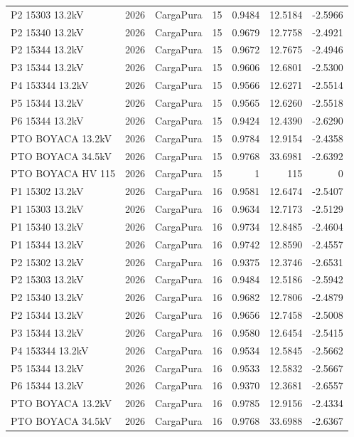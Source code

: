 \documentclass[11pt,a4paper]{article}
\begin{document}
\begin{longtable}{llllrrr}
P2 15303 13.2kV & 2026 & CargaPura & 15 & 0.9484 & 12.5184 & -2.5966 \\
P2 15340 13.2kV & 2026 & CargaPura & 15 & 0.9679 & 12.7758 & -2.4921 \\
P2 15344 13.2kV & 2026 & CargaPura & 15 & 0.9672 & 12.7675 & -2.4946 \\
P3 15344 13.2kV & 2026 & CargaPura & 15 & 0.9606 & 12.6801 & -2.5300 \\
P4 153344 13.2kV & 2026 & CargaPura & 15 & 0.9566 & 12.6271 & -2.5514 \\
P5 15344 13.2kV & 2026 & CargaPura & 15 & 0.9565 & 12.6260 & -2.5518 \\
P6 15344 13.2kV & 2026 & CargaPura & 15 & 0.9424 & 12.4390 & -2.6290 \\
PTO BOYACA 13.2kV & 2026 & CargaPura & 15 & 0.9784 & 12.9154 & -2.4358 \\
PTO BOYACA 34.5kV & 2026 & CargaPura & 15 & 0.9768 & 33.6981 & -2.6392 \\
PTO BOYACA HV 115 & 2026 & CargaPura & 15 & 1 & 115 & 0 \\
P1 15302 13.2kV & 2026 & CargaPura & 16 & 0.9581 & 12.6474 & -2.5407 \\
P1 15303 13.2kV & 2026 & CargaPura & 16 & 0.9634 & 12.7173 & -2.5129 \\
P1 15340 13.2kV & 2026 & CargaPura & 16 & 0.9734 & 12.8485 & -2.4604 \\
P1 15344 13.2kV & 2026 & CargaPura & 16 & 0.9742 & 12.8590 & -2.4557 \\
P2 15302 13.2kV & 2026 & CargaPura & 16 & 0.9375 & 12.3746 & -2.6531 \\
P2 15303 13.2kV & 2026 & CargaPura & 16 & 0.9484 & 12.5186 & -2.5942 \\
P2 15340 13.2kV & 2026 & CargaPura & 16 & 0.9682 & 12.7806 & -2.4879 \\
P2 15344 13.2kV & 2026 & CargaPura & 16 & 0.9656 & 12.7458 & -2.5008 \\
P3 15344 13.2kV & 2026 & CargaPura & 16 & 0.9580 & 12.6454 & -2.5415 \\
P4 153344 13.2kV & 2026 & CargaPura & 16 & 0.9534 & 12.5845 & -2.5662 \\
P5 15344 13.2kV & 2026 & CargaPura & 16 & 0.9533 & 12.5832 & -2.5667 \\
P6 15344 13.2kV & 2026 & CargaPura & 16 & 0.9370 & 12.3681 & -2.6557 \\
PTO BOYACA 13.2kV & 2026 & CargaPura & 16 & 0.9785 & 12.9156 & -2.4334 \\
PTO BOYACA 34.5kV & 2026 & CargaPura & 16 & 0.9768 & 33.6988 & -2.6367 \\

\end{longtable}
\end{document}
